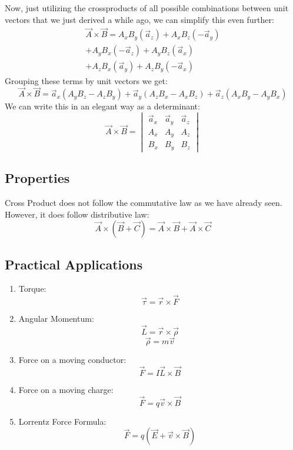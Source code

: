             Now, just utilizing the crossproducts of all possible combinations between unit vectors that we just derived a while ago, we can simplify this even further:
            \begin{align*}
            \vec{A}\times\vec{B} = A_xB_y(\vec{a}_z) + A_xB_z(-\vec{a}_y)\\ + A_yB_x(-\vec{a}_z)  + A_yB_z(\vec{a}_x)\\ + A_zB_x(\vec{a}_y) + A_zB_y(-\vec{a}_x) 
            \end{align*}
            Grouping these terms by unit vectors we get:
            \begin{equation}
                \vec{A}\times\vec{B} = \vec{a}_x(A_yB_z-A_zB_y) + \vec{a}_y(A_zB_x-A_xB_z) + \vec{a}_z(A_xB_y-A_yB_x)
            \end{equation}
            We can write this in an elegant way as a determinant:
            \begin{equation}
                \vec{A}\times\vec{B} = \begin{vmatrix}
                    \vec{a}_x & \vec{a}_y & \vec{a}_z \\
                    A_x & A_y & A_z\\
                    B_x & B_y & B_z
                \end{vmatrix}
            \end{equation}
        \subsection{Properties}
            Cross Product does not follow the commutative law as we have already seen. However, it does follow distributive law:
            $$\vec{A}\times\left(\vec{B}+\vec{C}\right) = \vec{A}\times\vec{B} + \vec{A}\times\vec{C}$$
        \subsection{Practical Applications}
            \begin{enumerate}
                \item Torque: $$\vec{\tau}=\vec{r}\times\vec{F}$$
                \item Angular Momentum: $$\vec{L}=\vec{r}\times\vec{\rho}$$ $$\vec{\rho}=m\vec{v}$$
                \item Force on a moving conductor: $$\vec{F} = I\vec{L}\times\vec{B}$$
                \item Force on a moving charge: $$\vec{F} = q\vec{v}\times\vec{B}$$
                \item Lorrentz Force Formula: $$\vec{F}=q\left(\vec{E}+\vec{v}\times\vec{B}\right)$$
            \end{enumerate}
